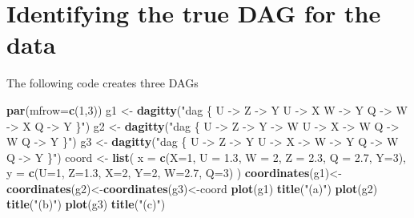 \documentclass[
]{book}
\newenvironment{Shaded}{\begin{snugshade}}{\end{snugshade}}
\newcommand{\AttributeTok}[1]{\textcolor[rgb]{0.13,0.29,0.53}{#1}}
\newcommand{\DecValTok}[1]{\textcolor[rgb]{0.00,0.00,0.81}{#1}}
\newcommand{\FloatTok}[1]{\textcolor[rgb]{0.00,0.00,0.81}{#1}}
\newcommand{\FunctionTok}[1]{\textcolor[rgb]{0.13,0.29,0.53}{\textbf{#1}}}
\newcommand{\NormalTok}[1]{#1}
\newcommand{\OtherTok}[1]{\textcolor[rgb]{0.56,0.35,0.01}{#1}}
\newcommand{\StringTok}[1]{\textcolor[rgb]{0.31,0.60,0.02}{#1}}
\begin{document}
\section{Identifying the true DAG for the data}\label{identifying-the-true-dag-for-the-data}

The following code creates three DAGs

\begin{Shaded}
\begin{Highlighting}[]
\FunctionTok{par}\NormalTok{(}\AttributeTok{mfrow=}\FunctionTok{c}\NormalTok{(}\DecValTok{1}\NormalTok{,}\DecValTok{3}\NormalTok{))}
\NormalTok{g1 }\OtherTok{\textless{}{-}} \FunctionTok{dagitty}\NormalTok{(}\StringTok{"dag \{}
\StringTok{    U {-}\textgreater{} Z {-}\textgreater{} Y }
\StringTok{    U {-}\textgreater{} X}
\StringTok{    W {-}\textgreater{} Y}
\StringTok{    Q {-}\textgreater{} W {-}\textgreater{} X}
\StringTok{    Q {-}\textgreater{} Y}
\StringTok{    \}"}\NormalTok{)}
\NormalTok{g2 }\OtherTok{\textless{}{-}} \FunctionTok{dagitty}\NormalTok{(}\StringTok{"dag \{}
\StringTok{    U {-}\textgreater{} Z {-}\textgreater{} Y {-}\textgreater{} W }
\StringTok{    U {-}\textgreater{} X {-}\textgreater{} W }
\StringTok{    Q {-}\textgreater{} W}
\StringTok{    Q {-}\textgreater{} Y}
\StringTok{    \}"}\NormalTok{)}
\NormalTok{g3 }\OtherTok{\textless{}{-}} \FunctionTok{dagitty}\NormalTok{(}\StringTok{"dag \{}
\StringTok{    U {-}\textgreater{} Z {-}\textgreater{} Y }
\StringTok{    U {-}\textgreater{} X {-}\textgreater{} W  {-}\textgreater{} Y}
\StringTok{    Q {-}\textgreater{} W}
\StringTok{    Q {-}\textgreater{} Y}
\StringTok{    \}"}\NormalTok{)}
\NormalTok{coord }\OtherTok{\textless{}{-}} 
  \FunctionTok{list}\NormalTok{( }\AttributeTok{x =} \FunctionTok{c}\NormalTok{(}\AttributeTok{X=}\DecValTok{1}\NormalTok{, }\AttributeTok{U =} \FloatTok{1.3}\NormalTok{, }\AttributeTok{W =} \DecValTok{2}\NormalTok{, }\AttributeTok{Z =} \FloatTok{2.3}\NormalTok{, }\AttributeTok{Q =} \FloatTok{2.7}\NormalTok{, }\AttributeTok{Y=}\DecValTok{3}\NormalTok{), }
        \AttributeTok{y =} \FunctionTok{c}\NormalTok{(}\AttributeTok{U=}\DecValTok{1}\NormalTok{,   }\AttributeTok{Z=}\FloatTok{1.3}\NormalTok{, }\AttributeTok{X=}\DecValTok{2}\NormalTok{, }\AttributeTok{Y=}\DecValTok{2}\NormalTok{,   }\AttributeTok{W=}\FloatTok{2.7}\NormalTok{,  }\AttributeTok{Q=}\DecValTok{3}\NormalTok{)}
\NormalTok{  )}
\FunctionTok{coordinates}\NormalTok{(g1)}\OtherTok{\textless{}{-}}\FunctionTok{coordinates}\NormalTok{(g2)}\OtherTok{\textless{}{-}}\FunctionTok{coordinates}\NormalTok{(g3)}\OtherTok{\textless{}{-}}\NormalTok{coord}
\FunctionTok{plot}\NormalTok{(g1)}
\FunctionTok{title}\NormalTok{(}\StringTok{"(a)"}\NormalTok{)}
\FunctionTok{plot}\NormalTok{(g2)}
\FunctionTok{title}\NormalTok{(}\StringTok{"(b)"}\NormalTok{)}
\FunctionTok{plot}\NormalTok{(g3)}
\FunctionTok{title}\NormalTok{(}\StringTok{"(c)"}\NormalTok{)}
\end{Highlighting}
\end{Shaded}
\end{document}

